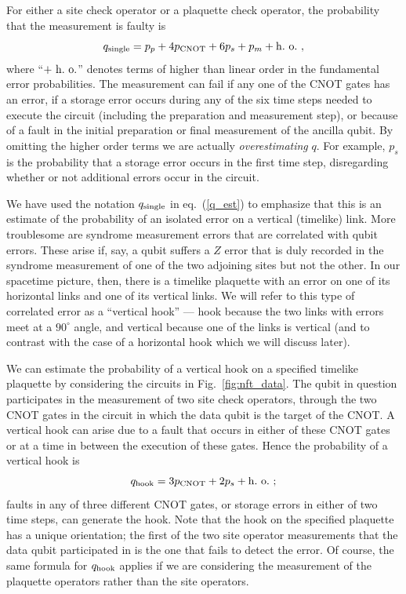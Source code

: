 For either a site check operator or a plaquette check operator, the probability that the measurement is faulty is
\begin{equation}
q_{\rm single} = p_p + 4 p_{\rm CNOT} + 6 p_s + p_m + {\rm h.~o.}~,
\label{q_est}
\end{equation}
where ``$+~{\rm h.~o.}$'' denotes terms of higher than linear order in the fundamental error probabilities. The measurement can fail if any one of the CNOT gates has an error, if a storage error occurs during any of the six time steps needed to execute the circuit (including the preparation and measurement step), or because of a fault in the initial preparation or final measurement of the ancilla qubit. By omitting the higher order terms we are actually {\em overestimating} $q$. For example, $p_s$ is the probability that a storage error occurs in the first time step, disregarding whether or not additional errors occur in the circuit.

We have used the notation $q_{\rm single}$ in eq.~(\ref{q_est}) to emphasize that this is an estimate of the probability of an isolated error on a vertical (timelike) link. 
More troublesome are syndrome measurement errors that are correlated with qubit errors. These arise if, say, a qubit suffers a $Z$ error that is duly recorded in the syndrome measurement of one of the two adjoining sites but not the other. In our spacetime picture, then, there is a timelike plaquette with an error on one of its horizontal links and one of its vertical links. We will refer to this type of correlated error as a ``vertical hook'' --- hook because the two links with errors meet at a $90^\circ$ angle, and vertical because one of the links is vertical (and to contrast with the case of a horizontal hook which we will discuss later). 

We can estimate the probability of a vertical hook on a specified timelike plaquette by considering the circuits in Fig.~\ref{fig:nft_data}. The qubit in question participates in the measurement of two site check operators, through the two CNOT gates in the circuit in which the data qubit is the target of the CNOT. A vertical hook can arise due to a fault that occurs in either of these CNOT gates or at a time in between the execution of these gates. Hence the probability of a vertical hook is
\begin{equation}
q_{\rm hook}=3p_{\rm CNOT} + 2 p_s +{\rm h.~o.}~;
\end{equation}
faults in any of three different CNOT gates, or storage errors in either of two time steps, can generate the hook. Note that the hook on the specified plaquette has a unique orientation; the first of the two site operator measurements that the data qubit participated in is the one that fails to detect the error. Of course, the same formula for $q_{\rm hook}$ applies if we are considering the measurement of the plaquette operators rather than the site operators.

